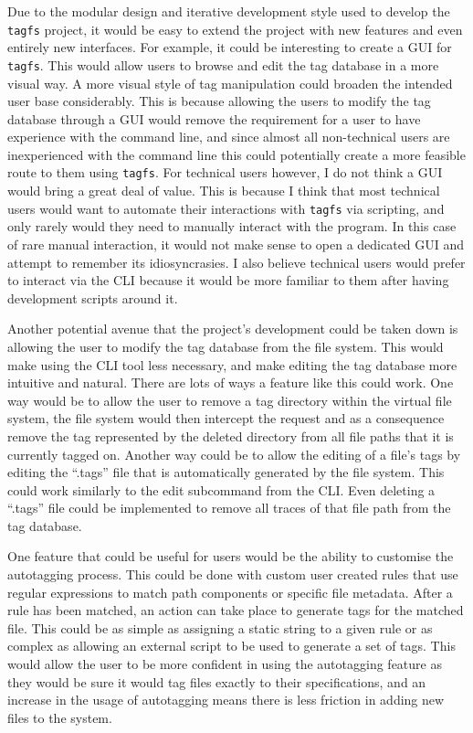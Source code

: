 
Due to the modular design and iterative development style used to develop the
\texttt{tagfs} project, it would be easy to extend the project with new
features and even entirely new interfaces. For example, it could be interesting
to create a GUI for \texttt{tagfs}. This would allow users to browse and edit
the tag database in a more visual way. A more visual style of tag manipulation
could broaden the intended user base considerably. This is because allowing the
users to modify the tag database through a GUI would remove the requirement for
a user to have experience with the command line, and since almost all
non-technical users are inexperienced with the command line this could
potentially create a more feasible route to them using \texttt{tagfs}. For
technical users however, I do not think a GUI would bring a great deal of
value. This is because I think that most technical users would want to automate
their interactions with \texttt{tagfs} via scripting, and only rarely would
they need to manually interact with the program. In this case of rare manual
interaction, it would not make sense to open a dedicated GUI and attempt to
remember its idiosyncrasies. I also believe technical users would prefer to
interact via the CLI because it would be more familiar to them after having
development scripts around it.

Another potential avenue that the project's development could be taken down is
allowing the user to modify the tag database from the file system. This would
make using the CLI tool less necessary, and make editing the tag database more
intuitive and natural. There are lots of ways a feature like this could work.
One way would be to allow the user to remove a tag directory within the virtual
file system, the file system would then intercept the request and as a
consequence remove the tag represented by the deleted directory from all file
paths that it is currently tagged on. Another way could be to allow the editing
of a file's tags by editing the ``.tags'' file that is automatically generated
by the file system. This could work similarly to the edit subcommand from the
CLI. Even deleting a ``.tags'' file could be implemented to remove all traces
of that file path from the tag database.

One feature that could be useful for users would be the ability to customise
the autotagging process. This could be done with custom user created rules that
use regular expressions to match path components or specific file metadata.
After a rule has been matched, an action can take place to generate tags for
the matched file. This could be as simple as assigning a static string to a
given rule or as complex as allowing an external script to be used to generate
a set of tags. This would allow the user to be more confident in using the
autotagging feature as they would be sure it would tag files exactly to their
specifications, and an increase in the usage of autotagging means there is less
friction in adding new files to the system.
